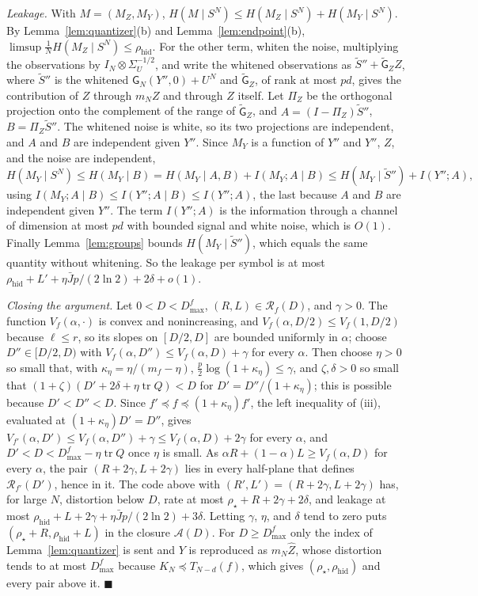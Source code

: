\documentclass[11pt,onecolumn]{IEEEtran}
\newcommand{\tr}{\operatorname{tr}}
\newcommand{\rhid}{\rho_{\mathrm{hid}}}
\begin{document}
\emph{Leakage.} With $M=(M_Z,M_Y)$,
$H(M\mid S^N)\le H(M_Z\mid S^N)+H(M_Y\mid S^N)$. By
Lemma~\ref{lem:quantizer}(b) and Lemma~\ref{lem:endpoint}(b),
$\limsup\tfrac1NH(M_Z\mid S^N)\le\rhid$. For the other term, whiten the
noise, multiplying the observations by $I_N\otimes\Sigma_U^{-1/2}$, and
write the whitened observations as $\tilde S''+\tilde{\mathsf G}_ZZ$,
where $\tilde S''$ is the whitened $\mathsf G_N(Y'',0)+U^N$ and
$\tilde{\mathsf G}_Z$, of rank at most $pd$, gives the contribution of
$Z$ through $m_NZ$ and through $Z$ itself. Let $\Pi_Z$ be the orthogonal
projection onto the complement of the range of $\tilde{\mathsf G}_Z$, and
$A=(I-\Pi_Z)\tilde S''$, $B=\Pi_Z\tilde S''$. The whitened noise is white,
so its two projections are independent, and $A$ and $B$ are independent
given $Y''$. Since $M_Y$ is a function of $Y''$ and $Y''$, $Z$, and the
noise are independent,
\[
H(M_Y\mid S^N)\le H(M_Y\mid B)=H(M_Y\mid A,B)+I(M_Y;A\mid B)\le H(M_Y\mid\tilde S'')+I(Y'';A),
\]
using $I(M_Y;A\mid B)\le I(Y'';A\mid B)\le I(Y'';A)$, the last because
$A$ and $B$ are independent given $Y''$. The term $I(Y'';A)$ is the
information through a channel of dimension at most $pd$ with bounded
signal and white noise, which is $O(1)$. Finally
Lemma~\ref{lem:groups} bounds $H(M_Y\mid\tilde S'')$, which equals the
same quantity without whitening. So the leakage per symbol is at most
$\rhid+L'+\eta\bar Jp/(2\ln2)+2\delta+o(1)$.

\emph{Closing the argument.} Let $0<D<D_{\max}^f$, $(R,L)\in\mathcal R_f(D)$,
and $\gamma>0$. The function $V_f(\alpha,\cdot)$ is convex and
nonincreasing, and $V_f(\alpha,D/2)\le V_f(1,D/2)$ because $\ell\le r$,
so its slopes on $[D/2,D]$ are bounded uniformly in $\alpha$; choose
$D''\in[D/2,D)$ with $V_f(\alpha,D'')\le V_f(\alpha,D)+\gamma$ for every
$\alpha$. Then choose $\eta>0$ so small that, with
$\kappa_\eta=\eta/(m_f-\eta)$, $\tfrac p2\log(1+\kappa_\eta)\le\gamma$, and
$\zeta,\delta>0$ so small that $(1+\zeta)(D'+2\delta+\eta\tr Q)<D$ for
$D'=D''/(1+\kappa_\eta)$; this is possible because $D'<D''<D$. Since
$f'\preceq f\preceq(1+\kappa_\eta)f'$, the left inequality of (iii),
evaluated at $(1+\kappa_\eta)D'=D''$, gives
$V_{f'}(\alpha,D')\le V_f(\alpha,D'')+\gamma\le V_f(\alpha,D)+2\gamma$ for
every $\alpha$, and $D'<D<D_{\max}^f-\eta\tr Q$ once $\eta$ is small. As
$\alpha R+(1-\alpha)L\ge V_f(\alpha,D)$ for every $\alpha$, the pair
$(R+2\gamma,L+2\gamma)$ lies in every half-plane that defines
$\mathcal R_{f'}(D')$, hence in it. The code above with
$(R',L')=(R+2\gamma,L+2\gamma)$ has, for large $N$, distortion below $D$,
rate at most $\rho_\star+R+2\gamma+2\delta$, and leakage at most
$\rhid+L+2\gamma+\eta\bar Jp/(2\ln2)+3\delta$. Letting $\gamma$, $\eta$,
and $\delta$ tend to zero puts $(\rho_\star+R,\rhid+L)$ in the closure
$\mathcal A(D)$. For $D\ge D_{\max}^f$ only the index of
Lemma~\ref{lem:quantizer} is sent and $Y$ is reproduced as $m_N\hat Z$,
whose distortion tends to at most $D_{\max}^f$ because
$K_N\preceq T_{N-d}(f)$, which gives $(\rho_\star,\rhid)$ and every pair
above it.
\hfill$\blacksquare$
\end{document}
